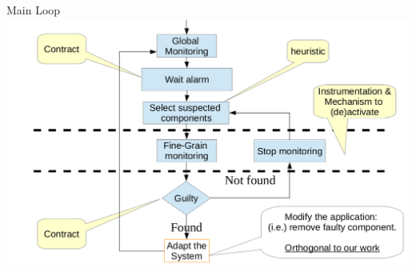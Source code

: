 \documentclass[10pt,xcolor={dvipsnames}]{beamer}
\begin{document}
	\begin{frame}{Main Loop}
		\centering
		\includegraphics[scale=0.3]{fig/scapegoat.png}
	\end{frame}
	
\end{document}
